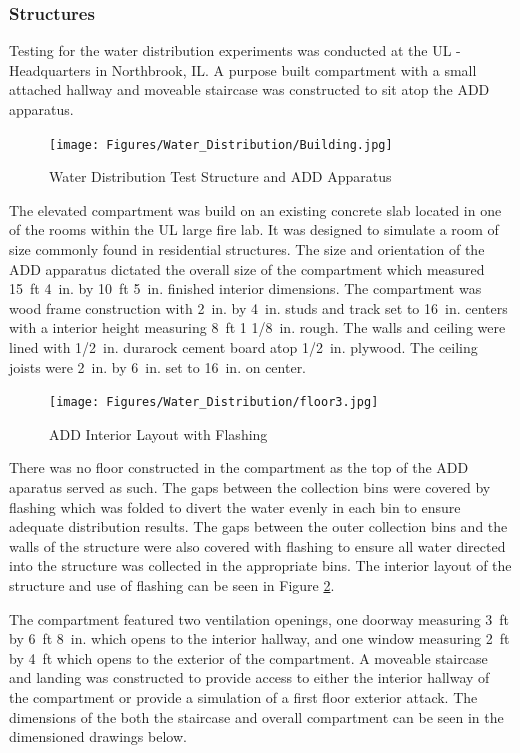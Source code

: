 \documentclass{article}
\begin{document}
\subsubsection{Structures}

Testing for the water distribution experiments was conducted at the UL - Headquarters in Northbrook, IL. A purpose built compartment with a small attached hallway and moveable staircase was constructed to sit atop the ADD apparatus.

\begin{figure}[!ht]
	\centering
	\texttt{[image: Figures/Water\_Distribution/Building.jpg]}
	\caption{Water Distribution Test Structure and ADD Apparatus}
	\label{fig:Water_Distribution_Test_Structure_and_ADD_Apparatus}
\end{figure}

The elevated compartment was build on an existing concrete slab located in one of the rooms within the UL large fire lab. It was designed to simulate a room of size commonly found in residential structures. The size and orientation of the ADD apparatus dictated the overall size of the compartment which measured 15~ft 4~in. by 10~ft 5~in. finished interior dimensions. The compartment was wood frame construction with 2~in. by 4~in. studs and track set to 16~in. centers with a interior height measuring 8~ft 1 1/8~in. rough. The walls and ceiling were lined with 1/2~in. durarock cement board atop 1/2~in. plywood. The ceiling joists were 2~in. by 6~in. set to 16~in. on center. 

\begin{figure}[!ht]
	\centering
	\texttt{[image: Figures/Water\_Distribution/floor3.jpg]}
	\caption{ADD Interior Layout with Flashing}
	\label{fig:ADD_Flashing}
\end{figure}

\clearpage

There was no floor constructed in the compartment as the top of the ADD aparatus served as such. The gaps between the collection bins were covered by flashing which was folded to divert the water evenly in each bin to ensure adequate distribution results. The gaps between the outer collection bins and the walls of the structure were also covered with flashing to ensure all water directed into the structure was collected in the appropriate bins. The interior layout of the structure and use of flashing can be seen in Figure \ref{fig:ADD_Flashing}. 

The compartment featured two ventilation openings, one doorway measuring 3~ft by 6~ft 8~in. which opens to the interior hallway, and one window measuring 2~ft by 4~ft which opens to the exterior of the compartment. A moveable staircase and landing was constructed to provide access to either the interior hallway of the compartment or provide a simulation of a first floor exterior attack. The dimensions of the both the staircase and overall compartment can be seen in the dimensioned drawings below.
\end{document}
